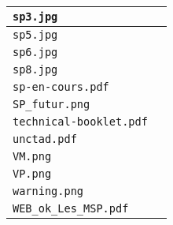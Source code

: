 \begin{center}
\begin{supertabular}{p{.8\textwidth}c}
\texttt{sp3.jpg} & \cite{sp3} \\ \hline

\texttt{sp5.jpg} & \cite{sp5} \\ \hline

\texttt{sp6.jpg} & \cite{sp6} \\ \hline

\texttt{sp8.jpg} & \cite{sp8} \\ \hline

\texttt{sp-en-cours.pdf} & \cite{sp-en-cours} \\ \hline

\texttt{SP\_futur.png} & \cite{SP_futur} \\ \hline

\texttt{technical-booklet.pdf} & \cite{technical-booklet} \\ \hline

\texttt{unctad.pdf} & \cite{unctad} \\ \hline

\texttt{VM.png} & \cite{VM} \\ \hline

\texttt{VP.png} & \cite{VP} \\ \hline

\texttt{warning.png} & \cite{warning} \\ \hline

\texttt{WEB\_ok\_Les\_MSP.pdf} & \cite{WEB_ok_Les_MSP} \\ \hline
\end{supertabular}
\end{center}

\newpage

\printbibliography[type=misc]



